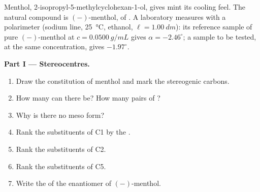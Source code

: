 \begin{problem}
\label{pb:b1:stereochemistry-in-depth:1}
Menthol, 2-isopropyl-5-methylcyclohexan-1-ol, gives mint its cooling
feel. The natural compound is $(-)$-menthol, of 
. A laboratory measures with a polarimeter (sodium line,
\qty{25}{\celsius}, ethanol, $\ell = \qty{1.00}{dm}$): its reference sample
of pure $(-)$-menthol at $c = \qty{0.0500}{g/mL}$ gives $\alpha =
-2.46^\circ$; a sample to be tested, at the same concentration, gives
$-1.97^\circ$.

\medskip
\noindent\textbf{Part I --- Stereocentres.}
\begin{enumerate}
  \item Draw the constitution of menthol and mark the stereogenic carbons.
  \item How many  can there be? How many pairs of
        ?
  \item Why is there no meso form?
  \item Rank the substituents of C1 by the .
  \item Rank the substituents of C2.
  \item Rank the substituents of C5.
  \item Write the  of the enantiomer of $(-)$-menthol.
\end{enumerate}


\end{problem}
